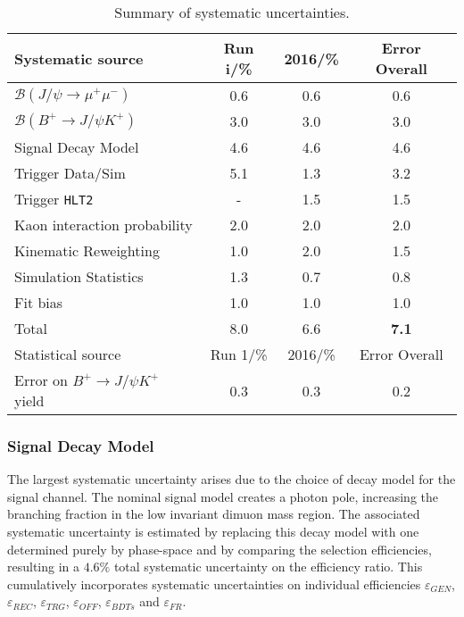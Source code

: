 \begin{table}[H]
\centering
\begin{tabular}{ l  c  c  c  }
\toprule
Systematic source & Run \Rn{1}/\% &  2016/\% & Error Overall \\ \hline

$\mathcal{B}(J/\psi \rightarrow \mu^{+} \mu^{-})$ & 0.6 & 0.6 & 0.6\\
$\mathcal{B}(B^{+} \rightarrow  J/\psi K^{+})$ & 3.0 & 3.0 & 3.0\\
\hline
Signal Decay Model & 4.6 & 4.6 & 4.6\\
Trigger Data/Sim & 5.1 & 1.3& 3.2\\
Trigger \texttt{HLT2} &  -  &  1.5& 1.5\\
Kaon interaction probability &  2.0  &  2.0& 2.0\\
Kinematic Reweighting & 1.0 & 2.0 &1.5\\
Simulation Statistics & 1.3 & 0.7 & 0.8 \\
Fit bias & 1.0 & 1.0 & 1.0  \\
 \hline
 Total & 8.0 & 6.6 & \textbf{7.1} \\
 \hline
Statistical source & Run 1/\% & 2016/\% & Error Overall \\ \hline
Error on $B^{+} \rightarrow J/\psi K^{+}$ yield & 0.3 & 0.3 & 0.2\\
 \bottomrule
\end{tabular}
\caption{Summary of systematic uncertainties.}
\label{tab:systematicsummary}
\end{table}




\subsubsection{Signal Decay Model}
The largest systematic uncertainty arises due to the choice of decay model for the signal channel.
The nominal signal model creates a photon pole, increasing the branching fraction in the low invariant dimuon mass region.
The associated systematic uncertainty is estimated by replacing this decay model with one determined purely by phase-space and by comparing the selection efficiencies, resulting in a $4.6\%$ total systematic uncertainty on the efficiency ratio. This cumulatively incorporates systematic uncertainties on individual efficiencies $\varepsilon_{GEN}$, $\varepsilon_{REC}$,  $\varepsilon_{TRG}$, $\varepsilon_{OFF}$, $\varepsilon_{BDTs}$ and $\varepsilon_{FR}$.

